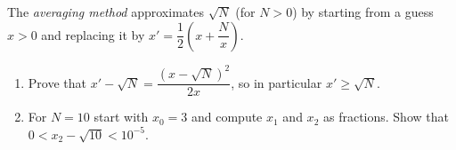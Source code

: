 The \emph{averaging method} approximates $\sqrt N$ (for $N>0$) by starting from a guess $x>0$ and replacing it by $x'=\dfrac{1}{2}\left(x+\dfrac{N}{x}\right)$.
\begin{enumerate}
\item[(a)] Prove that $x'-\sqrt N=\dfrac{(x-\sqrt N)^2}{2x}$, so in particular $x'\ge\sqrt N$.
\item[(b)] For $N=10$ start with $x_0=3$ and compute $x_1$ and $x_2$ as fractions. Show that $0<x_2-\sqrt{10}<10^{-5}$.
\end{enumerate}
